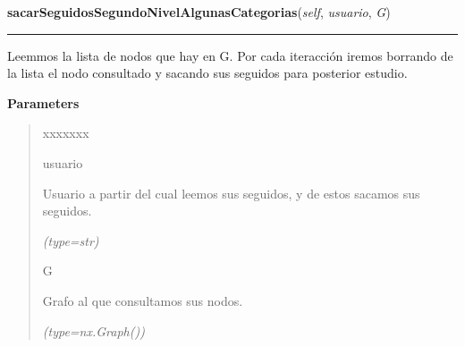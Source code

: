 \hspace{.8\funcindent}\begin{boxedminipage}{\funcwidth}

    \raggedright \textbf{sacarSeguidosSegundoNivelAlgunasCategorias}(\textit{self}, \textit{usuario}, \textit{G})

    \vspace{-1.5ex}

    \rule{\textwidth}{0.5\fboxrule}
\setlength{\parskip}{2ex}
    Leemmos la lista de nodos que hay en G. Por cada iteracción iremos 
    borrando de la lista el nodo consultado y sacando sus seguidos para 
    posterior estudio.

\setlength{\parskip}{1ex}
      \textbf{Parameters}
      \vspace{-1ex}

      \begin{quote}
        \begin{Ventry}{xxxxxxx}

          \item[usuario]

          Usuario a partir del cual leemos sus seguidos, y de estos sacamos
          sus seguidos.

            {\it (type=str)}

          \item[G]

          Grafo al que consultamos sus nodos.

            {\it (type=nx.Graph())}

        \end{Ventry}

      \end{quote}

    \end{boxedminipage}

    \label{grafo:Grafo:colorearNodos}

    \vspace{0.5ex}

